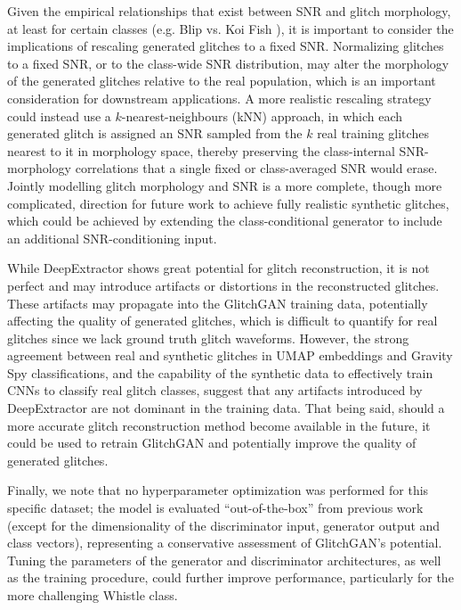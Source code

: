 \documentclass[reprint,nofootinbib,amsmath,amssymb,aps,floatfix]{revtex4-2}
\begin{document}
Given the empirical relationships that exist between SNR and glitch morphology, at least for certain classes (e.g. Blip vs. Koi Fish \cite{Areeda2017}), it is important to consider the implications of rescaling generated glitches to a fixed SNR.
Normalizing glitches to a fixed SNR, or to the class-wide SNR distribution, may alter the morphology of the generated glitches relative to the real population, which is an important consideration for downstream applications.
A more realistic rescaling strategy could instead use a $k$-nearest-neighbours (kNN) approach, in which each generated glitch is assigned an SNR sampled from the $k$ real training glitches nearest to it in morphology space, thereby preserving the class-internal SNR-morphology correlations that a single fixed or class-averaged SNR would erase.
Jointly modelling glitch morphology and SNR is a more complete, though more complicated, direction for future work to achieve fully realistic synthetic glitches, which could be achieved by extending the class-conditional generator to include an additional SNR-conditioning input.

While DeepExtractor shows great potential for glitch reconstruction, it is not perfect and may introduce artifacts or distortions in the reconstructed glitches.
These artifacts may propagate into the GlitchGAN training data, potentially affecting the quality of generated glitches, which is difficult to quantify for real glitches since we lack ground truth glitch waveforms.
However, the strong agreement between real and synthetic glitches in UMAP embeddings and Gravity Spy classifications, and the capability of the synthetic data to effectively train CNNs to classify real glitch classes, suggest that any artifacts introduced by DeepExtractor are not dominant in the training data.
That being said, should a more accurate glitch reconstruction method become available in the future, it could be used to retrain GlitchGAN and potentially improve the quality of generated glitches.

Finally, we note that no hyperparameter optimization was performed for this specific dataset; the model is evaluated ``out-of-the-box'' from previous work (except for the dimensionality of the discriminator input, generator output and class vectors), representing a conservative assessment of GlitchGAN's potential.
Tuning the parameters of the generator and discriminator architectures, as well as the training procedure, could further improve performance, particularly for the more challenging Whistle class.
\end{document}
